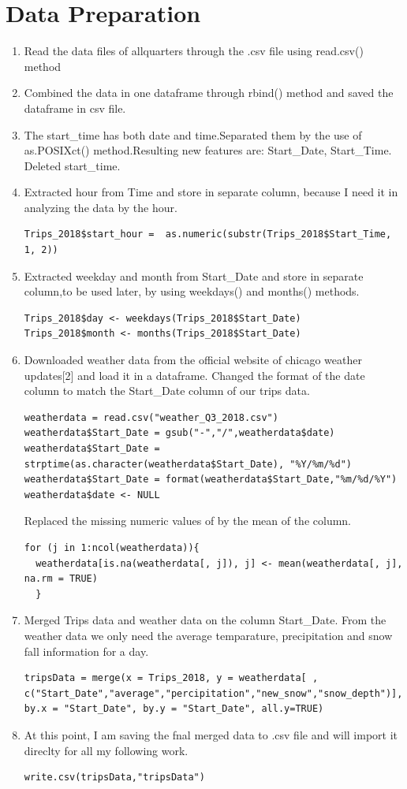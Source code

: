\documentclass[11pt]{article}
\begin{document}
\section{Data Preparation}
\begin{enumerate}
\item Read the data files of allquarters through the .csv file using read.csv() method
\item Combined the data in one dataframe through rbind() method and saved the dataframe in csv file.
\item The start\_time has both date and time.Separated them by the use of as.POSIXct() method.Resulting new features are: Start\_Date, Start\_Time. Deleted start\_time.
\item Extracted hour from Time and store in separate column, because I need it in analyzing the data by the hour.
\begin{lstlisting}
Trips_2018$start_hour =  as.numeric(substr(Trips_2018$Start_Time, 1, 2))
\end{lstlisting}
\item  Extracted weekday and month from Start\_Date and store in separate column,to be used later, by using weekdays() and months() methods.
\begin{lstlisting}
Trips_2018$day <- weekdays(Trips_2018$Start_Date)
Trips_2018$month <- months(Trips_2018$Start_Date)
\end{lstlisting}
\item Downloaded weather data from the official website of chicago weather updates[2] and load it in a dataframe. Changed the format of the date column to match the Start\_Date column of our trips data.
\begin{lstlisting}
weatherdata = read.csv("weather_Q3_2018.csv")
weatherdata$Start_Date = gsub("-","/",weatherdata$date)
weatherdata$Start_Date = strptime(as.character(weatherdata$Start_Date), "%Y/%m/%d")
weatherdata$Start_Date = format(weatherdata$Start_Date,"%m/%d/%Y")
weatherdata$date <- NULL
\end{lstlisting}
Replaced the missing numeric values of by the mean of the column.
\begin{lstlisting}
for (j in 1:ncol(weatherdata)){ 
  weatherdata[is.na(weatherdata[, j]), j] <- mean(weatherdata[, j], na.rm = TRUE) 
  }
\end{lstlisting}
\item Merged Trips data and weather data on the column Start\_Date. From the weather data we only need the average temparature, precipitation and snow fall information for a day.
\begin{lstlisting}
tripsData = merge(x = Trips_2018, y = weatherdata[ , c("Start_Date","average","percipitation","new_snow","snow_depth")], by.x = "Start_Date", by.y = "Start_Date", all.y=TRUE)
\end{lstlisting}
\item At this point, I am saving the fnal merged data to .csv file and will import it direclty for all my following work.
\begin{lstlisting}
write.csv(tripsData,"tripsData")
\end{lstlisting}
\end{enumerate}
\end{document}

